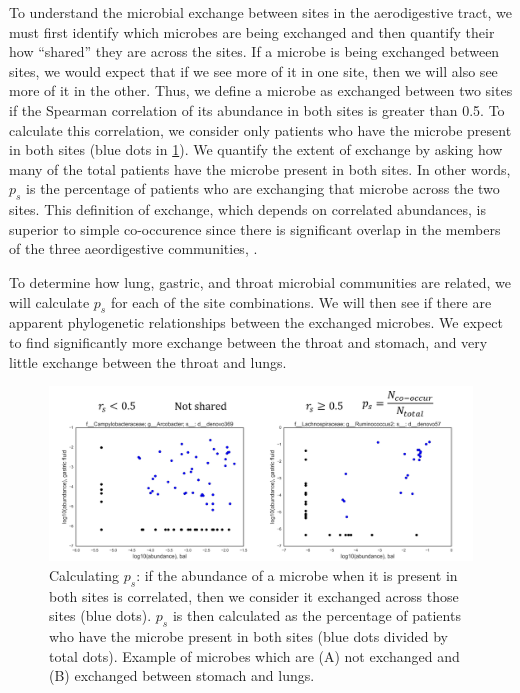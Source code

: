 \documentclass[12pt]{article}
\begin{document}
To understand the microbial exchange between sites in the 
aerodigestive tract, we must first identify which microbes are being exchanged
and then quantify their how ``shared'' they are across the sites. 
If a microbe is being exchanged between sites, we would expect that if we see 
more of it in one site, then we will also see more of it in the other. 
Thus, we define a microbe as exchanged between two sites if the Spearman 
correlation of its abundance in both sites is greater than 0.5. To 
calculate this correlation, we consider only patients who have the microbe present in both sites (blue dots in \ref{fig:sharedness_defn}).
We quantify the extent of exchange by asking how many of the total patients
have the microbe present in both sites. In other words, $p_s$ is the 
percentage of patients who are exchanging that microbe across the two sites.
This definition of exchange, which depends on correlated abundances, is 
superior to simple co-occurence since there is significant overlap in the
members of the three aeordigestive communities\cite{bassis-source-2015}, \cite{charslon-topographical-2011}.

To determine how lung, gastric, and throat microbial communities are related,
we will calculate $p_s$ for each of the site combinations. We will 
then see if there are apparent phylogenetic relationships between
the exchanged microbes. We expect to find significantly more exchange
between the throat and stomach, and very little exchange between the throat and lungs. 

\begin{figure}
\begin{center}
    \includegraphics[scale=0.6]{sharedness_definition}
    \caption{Calculating $p_s$: if the abundance of a microbe when it is 
    present in both sites is correlated, then we consider it exchanged 
    across those sites (blue dots). $p_s$ is then calculated as the 
    percentage of patients who have the microbe present in both sites (blue 
    dots divided by total dots). Example of microbes which are (A) not 
    exchanged and (B) exchanged between stomach and lungs.}\label{fig:sharedness_defn}
\end{center}
\end{figure}
\end{document}
